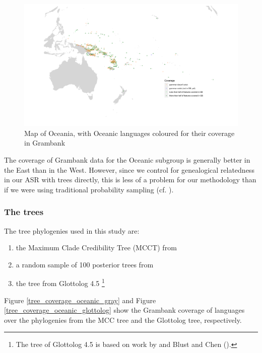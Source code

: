 \documentclass[12pt,letterpaper]{article}
\begin{document}
\begin{figure}
\centering
\includegraphics[width=\textwidth]{illustrations/plots_from_R/coverage_plots/maps/coverage_map_oceanic.png}
\caption{Map of Oceania, with Oceanic languages coloured for their coverage in Grambank}
\label{GB_austro_coverage}
\end{figure} %

The coverage of Grambank data for the Oceanic subgroup is generally better in the East than in the West. However, since we control for genealogical relatedness in our ASR with trees directly, this is less of a problem for our methodology than if we were using traditional probability sampling (cf. \citealt{ross2004morphosyntactic}).

\FloatBarrier
\subsubsection{The trees}
\label{the_trees}
The tree phylogenies used in this study are: 

\begin{enumerate}[label=(\alph*)]
    \item the Maximum Clade Credibility Tree (MCCT) from \citet{grayetal_2009}
    \item a random sample of 100 posterior trees from \citet{grayetal_2009} 
    \item the tree from Glottolog 4.5 \citep{glottolog4_5}\footnote{The tree of Glottolog 4.5 \citep{glottolog4_5} is based on work by \citet{blust_2009, blust_2014} and Blust and Chen (\citeyear{blust_chen_2017}).}
\end{enumerate}

Figure \ref{tree_coverage_oceanic_gray} and Figure \ref{tree_coverage_oceanic_glottolog} show the Grambank coverage of languages over the phylogenies from the \citet{grayetal_2009} MCC tree and the Glottolog tree, respectively. 
\end{document}
